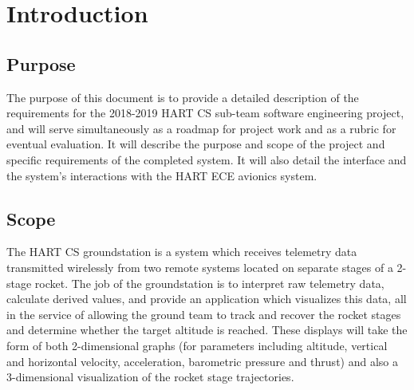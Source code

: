 \documentclass[onecolumn, draftclsnofoot,10pt, compsoc]{IEEEtran}
\begin{document}
	\newpage
	\tableofcontents
	\clearpage


	\section{Introduction}
		\subsection{Purpose}
			The purpose of this document is to provide a detailed description of the requirements for the 2018-2019 HART CS sub-team software engineering project, and will serve simultaneously as a roadmap for project work and as a rubric for eventual evaluation. 
			It will describe the purpose and scope of the project and specific requirements of the completed system. 
			It will also detail the interface and the system's interactions with the HART ECE avionics system.

		\subsection{Scope}
			The HART CS groundstation is a system which receives telemetry data transmitted wirelessly from two remote systems located on separate stages of a 2-stage rocket. 
			The job of the groundstation is to interpret raw telemetry data, calculate derived values, and provide an application which visualizes this data, all in the service of allowing the ground team to track and recover the rocket stages and determine whether the target altitude is reached.
			These displays will take the form of both 2-dimensional graphs (for parameters including altitude, vertical and horizontal velocity, acceleration, barometric pressure and thrust) and also a 3-dimensional visualization of the rocket stage trajectories.
\end{document}
